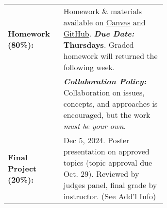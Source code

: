 \begin{tabular}{l p{0.65\linewidth}}
 
\textbf{Homework (80\%):}       &  Homework \& materials 
                                   available on \href{\CanvasURL}{Canvas} and
                                   \href{\GitHubURL}{GitHub}. \emph{\textbf{Due Date:}} \textbf{Thursdays}. 
                                  Graded homework will returned the following week. \\
                                & \emph{\textbf{Collaboration Policy:}} Collaboration on issues,
                                  concepts, and approaches is encouraged, but the work
                                  \textit{must be your own}.\\

\textbf{Final Project (20\%):}  & Dec 5, 2024. Poster presentation on approved topics (topic approval due Oct. 29). Reviewed by judges panel, final grade by instructor. (See Add'l Info) \\

\end{tabular}